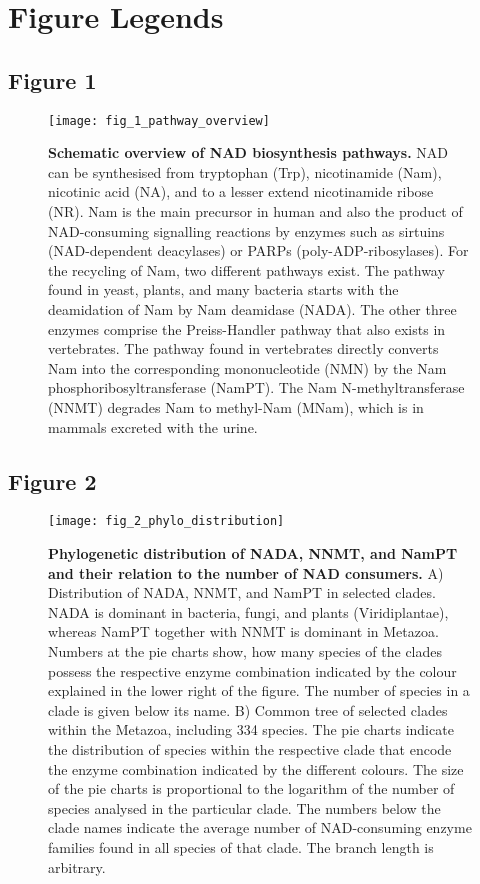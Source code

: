 
\newpage

\section*{Figure Legends}

\subsection*{Figure 1}

\begin{figure}[ht]
  \centering
  \texttt{[image: fig\_1\_pathway\_overview]}
  \caption{\textbf{Schematic overview of NAD biosynthesis pathways.} NAD can be synthesised from tryptophan (Trp), nicotinamide (Nam), nicotinic acid (NA), and to a lesser extend nicotinamide ribose (NR). Nam is the main precursor in human and also the product of NAD-consuming signalling reactions by enzymes such as sirtuins (NAD-dependent deacylases) or PARPs (poly-ADP-ribosylases). For the recycling of Nam, two different pathways exist. The pathway found in yeast, plants, and many bacteria starts with the deamidation of Nam by Nam deamidase (NADA). The other three enzymes comprise the Preiss-Handler pathway that also exists in vertebrates. The pathway found in vertebrates directly converts Nam into the corresponding mononucleotide (NMN) by the Nam phosphoribosyltransferase (NamPT). The Nam N-methyltransferase (NNMT) degrades Nam to methyl-Nam (MNam), which is in mammals excreted with the urine.}
  \label{fig:pathway_overview}
\end{figure}

\newpage


\subsection*{Figure 2}

\begin{figure}[ht]
  \centering
  \texttt{[image: fig\_2\_phylo\_distribution]}
  \caption{\textbf{Phylogenetic distribution of NADA, NNMT, and NamPT and their relation to the number of NAD consumers.} A) Distribution of NADA, NNMT, and NamPT in selected clades. NADA is dominant in bacteria, fungi, and plants (Viridiplantae), whereas NamPT together with NNMT is dominant in Metazoa. Numbers at the pie charts show, how many species of the clades possess the respective enzyme combination indicated by the colour explained in the lower right of the figure. The number of species in a clade is given below its name. B) Common tree of selected clades within the Metazoa, including 334 species. The pie charts indicate the distribution of species within the respective clade that encode the enzyme combination indicated by the different colours. The size of the pie charts is proportional to the logarithm of the number of species analysed in the particular clade. The numbers below the clade names indicate the average number of NAD-consuming enzyme families found in all species of that clade. The branch length is arbitrary.}
  \label{fig:phylo_distribution}
\end{figure}

